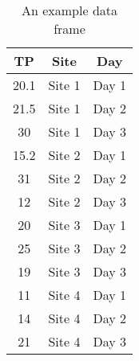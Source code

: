 \documentclass{article}
\begin{document}
\begin{table}[t]
\centering
\caption{An example data frame}
\begin{tabular}{ccc}\hline
 TP& Site & Day \\ \hline
20.1 &Site 1 & Day 1\\
21.5 &Site 1 & Day 2\\
30   &Site 1 & Day 3\\
15.2 &Site 2 & Day 1\\
31   &Site 2 & Day 2\\
12   &Site 2 & Day 3\\
20   &Site 3 & Day 1\\
25   &Site 3 & Day 2\\
19   &Site 3 & Day 3\\
11   &Site 4 & Day 1\\
14   &Site 4 & Day 2\\
21   &Site 4 & Day 3\\ \hline
\end{tabular}
\label{tab:exdataframe}
\end{table}
\end{document}
